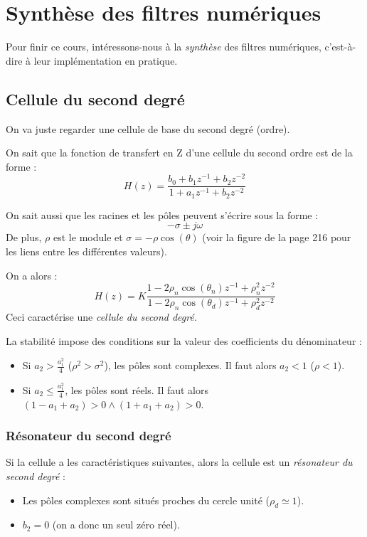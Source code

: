 \chapter{Synthèse des filtres numériques}
    Pour finir ce cours, intéressons-nous à la \textit{synthèse} des filtres numériques, c'est-à-dire à leur implémentation en pratique.

    \section{Cellule du second degré}
        On va juste regarder une cellule de base du second degré (ordre).

        On sait que la fonction de transfert en Z d'une cellule du second ordre est de la forme :
        $$
            H(z) = \frac{b_0 + b_1z^{-1} + b_2z^{-2}}{1 + a_1z^{-1} + b_2z^{-2}}
        $$

        On sait aussi que les racines et les pôles peuvent s'écrire sous la forme :
        $$
            -\sigma \pm j \omega
        $$
        De plus, $\rho$ est le module et $\sigma = -\rho\cos(\theta)$ (voir la figure de la page 216 pour les liens entre les différentes valeurs).

        On a alors :
        $$
            H(z) = K \frac{1 - 2\rho_n\cos(\theta_n)z^{-1} + \rho_n^2 z^{-2}}{1 - 2\rho_n\cos(\theta_d)z^{-1} + \rho_d^2 z^{-2}}
        $$
        Ceci caractérise une \textit{cellule du second degré}.

        La stabilité impose des conditions sur la valeur des coefficients du dénominateur :
        \begin{itemize}
            \item Si $a_2 > \frac{a_1^2}{4}$ ($\rho^2 > \sigma^2$), les pôles sont complexes. Il faut alors $a_2 < 1$ ($\rho < 1$).
            \item Si $a_2 \leq \frac{a_1^2}{4}$, les pôles sont réels. Il faut alors $(1 - a_1 + a_2) > 0 \land (1 + a_1 + a_2) > 0$.
        \end{itemize}

        \subsection{Résonateur du second degré}
            Si la cellule a les caractéristiques suivantes, alors la cellule est un \textit{résonateur du second degré} :
            \begin{itemize}
                \item Les pôles complexes sont situés proches du cercle unité ($\rho_d \simeq 1$).
                \item $b_2 = 0$ (on a donc un seul zéro réel).
            \end{itemize}

